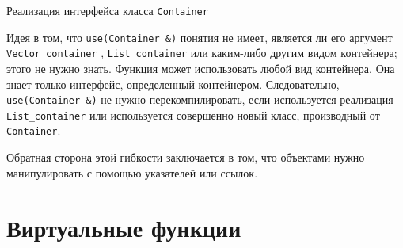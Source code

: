 \documentclass[
    8pt,
    hyperref={pdfencoding=unicode}
    ]{beamer}
\theoremstyle{definition}
\begin{document}
\begin{frame}{Реализация интерфейса класса \texttt{Container}}
    
    Идея в том, что \texttt{use(Container &)} понятия не имеет, является ли его аргумент \texttt{Vector_container} , 
    \texttt{List_container} или каким-либо другим видом контейнера; этого не нужно знать. Функция может использовать любой вид 
    контейнера. Она знает только интерфейс, определенный контейнером. Следовательно, \texttt{use(Container &)} не нужно 
    перекомпилировать, если используется реализация \texttt{List_container} или используется совершенно новый класс, 
    производный от \texttt{Container}.
    
    \vspace{4mm}
    
    Обратная сторона этой гибкости заключается в том, что объектами нужно манипулировать с помощью указателей или ссылок.
    
\end{frame}

\section{Виртуальные функции}
\end{document}
